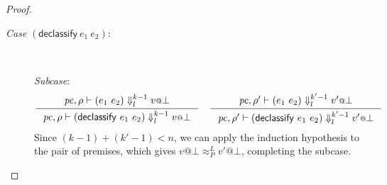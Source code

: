 \documentclass{article}
\makeatletter
\theoremstyle{definition}
\newcommand{\at}{\ensuremath{{\scriptstyle{@}}}}
\newcommand{\pc}{\ensuremath{{\mathit{pc}}}}
\makeatother
\begin{document}
\begin{proof}
\begin{description}
  \item[\emph{Case} $(\mathsf{declassify}\ e_1\ e_2)$:]\
    
    \emph{Subcase}:
    \begin{gather*}
      \inference{
        \pc, \rho |- (e_1\ e_2) \Downarrow^{k-1}_{l} v \at \bot
      }{
        \pc, \rho |- (\mathsf{declassify}\ e_1\ e_2) \Downarrow^{k-1}_{l}
        v \at \bot
      }
      \quad
      \inference{
        \pc, \rho' |- (e_1\ e_2) \Downarrow^{k'-1}_{l} v' \at \bot
      }{
        \pc, \rho' |- (\mathsf{declassify}\ e_1\ e_2) \Downarrow^{k'-1}_{l}
        v' \at \bot
      }
    \end{gather*}
    Since $(k-1) + (k'-1) < n$, we can apply the induction hypothesis to
    the pair of premises, which gives
    $v \at \bot \approx^{L}_{P} v' \at \bot$, completing the subcase.


\end{description}
\end{proof}
\end{document}
